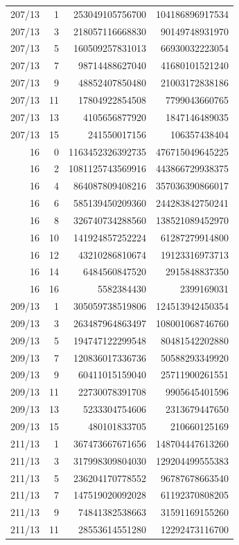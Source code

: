 \begin{longtable}{@{}rrrr@{}}
207/13 & 1 & 253049105756700 & 104186896917534\\
207/13 & 3 & 218057116668830 & 90149748931970\\
207/13 & 5 & 160509257831013 & 66930032223054\\
207/13 & 7 & 98714488627040 & 41680101521240\\
207/13 & 9 & 48852407850480 & 21003172838186\\
207/13 & 11 & 17804922854508 & 7799043660765\\
207/13 & 13 & 4105656877920 & 1847146489035\\
207/13 & 15 & 241550017156 & 106357438404\\
16 & 0 & 1163452326392735 & 476715049645225\\
16 & 2 & 1081125743569916 & 443866729938375\\
16 & 4 & 864087809408216 & 357036390866017\\
16 & 6 & 585139450209360 & 244283842750241\\
16 & 8 & 326740734288560 & 138521089452970\\
16 & 10 & 141924857252224 & 61287279914800\\
16 & 12 & 43210286810674 & 19123316973713\\
16 & 14 & 6484560847520 & 2915848837350\\
16 & 16 & 5582384430 & 2399169031\\
209/13 & 1 & 305059738519806 & 124513942450354\\
209/13 & 3 & 263487964863497 & 108001068746760\\
209/13 & 5 & 194747122299548 & 80481542202880\\
209/13 & 7 & 120836017336736 & 50588293349920\\
209/13 & 9 & 60411015159040 & 25711900261551\\
209/13 & 11 & 22730078391708 & 9905645401596\\
209/13 & 13 & 5233304754606 & 2313679447650\\
209/13 & 15 & 480101833705 & 210660125169\\
211/13 & 1 & 367473667671656 & 148704447613260\\
211/13 & 3 & 317998309804030 & 129204499555383\\
211/13 & 5 & 236204170778552 & 96787678663540\\
211/13 & 7 & 147519020092028 & 61192370808205\\
211/13 & 9 & 74841382538663 & 31591169155260\\
211/13 & 11 & 28553614551280 & 12292473116700\\

\end{longtable}
